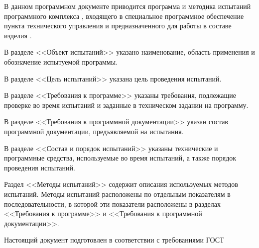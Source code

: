 \newpage\annotation

В данном программном документе приводится программа и методика испытаний программного комплекса \programname, входящего в специальное программное обеспечение пункта технического управления и предназначенного для работы в составе изделия \productname.

В разделе <<Объект испытаний>> указано наименование, область применения и обозначение испытуемой программы.

В разделе <<Цель испытаний>> указана цель проведения испытаний.

В разделе <<Требования к программе>> указаны требования, подлежащие проверке во время испытаний и заданные в техническом задании на программу.

В разделе <<Требования к программной документации>> указан состав программной документации, предъявляемой на испытания.

В разделе <<Состав и порядок испытаний>> указаны технические и программные средства, используемые во время испытаний, а также порядок проведения испытаний.

Раздел <<Методы испытаний>> содержит описания используемых методов испытаний. Методы испытаний расположены по отдельным показателям
в последовательности, в которой эти показатели расположены в разделах <<Требования к программе>> и <<Требования к программной документации>>.

Настоящий документ подготовлен в соответствии с требованиями ГОСТ~\cite{gost19301}
